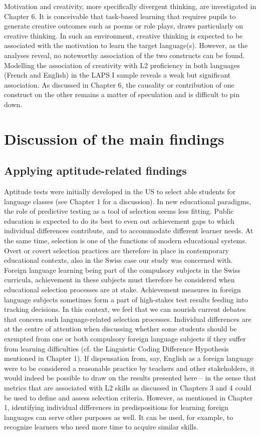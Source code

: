 \documentclass[output=paper]{langsci/langscibook}
\begin{document}
Motivation and creativity, more specifically divergent thinking, are investigated in Chapter 6. It is conceivable that task-based learning that requires pupils to generate creative outcomes such as poems or role plays, draws particularly on creative thinking. In such an environment, creative thinking is expected to be associated with the motivation to learn the target language(s). However, as the analyses reveal, no noteworthy association of the two constructs can be found. Modelling the association of creativity with L2 proficiency in both languages (French and English) in the LAPS I sample reveals a weak but significant association. As discussed in Chapter 6, the causality or contribution of one construct on the other remains a matter of speculation and is difficult to pin down.

\section{Discussion of the main findings}
\subsection{Applying aptitude-related findings}

Aptitude tests were initially developed in the US to select able students for language classes (see Chapter 1 for a discussion). In new educational paradigms, the role of predictive testing as a tool of selection seems less fitting. Public education is expected to do its best to even out achievement gaps to which individual differences contribute, and to accommodate different learner needs. At the same time, selection is one of the functions of modern educational systems. Overt or covert selection practices are therefore in place in contemporary educational contexts, also in the Swiss case our study was concerned with. Foreign language learning being part of the compulsory subjects in the Swiss curricula, achievement in these subjects must therefore be considered when educational selection processes are at stake. Achievement measures in foreign language subjects sometimes form a part of high-stakes test results feeding into tracking decisions. In this context, we feel that we can nourish current debates that concern such language-related selection processes. Individual differences are at the centre of attention when discussing whether some students should be exempted from one or both compulsory foreign language subjects if they suffer from learning difficulties (cf. the Linguistic Coding Difference Hypothesis mentioned in Chapter 1). If dispensation from, say, English as a foreign language were to be considered a reasonable practice by teachers and other stakeholders, it would indeed be possible to draw on the results presented here – in the sense that metrics that are associated with L2 skills as discussed in Chapters 3 and 4 could be used to define and assess selection criteria. However, as mentioned in Chapter 1, identifying individual differences in predispositions for learning foreign languages can serve other purposes as well. It can be used, for example, to recognize learners who need more time to acquire similar skills. 
\end{document}
